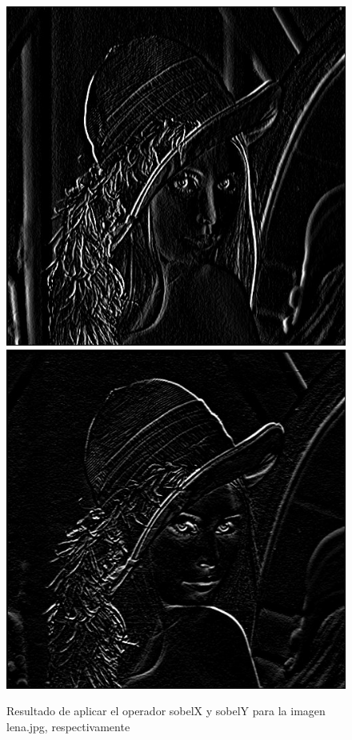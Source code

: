 \documentclass[11pt, a4paper]{article}
\begin{document}
\begin{figure}[ht] %
\centering
\includegraphics[scale=0.30]{sobelX.jpg}\hspace{1cm}
\includegraphics[scale=0.30]{sobelY.jpg}
\caption{Resultado de aplicar el operador sobelX y sobelY para la imagen lena.jpg, respectivamente}
\end{figure}
\end{document}
